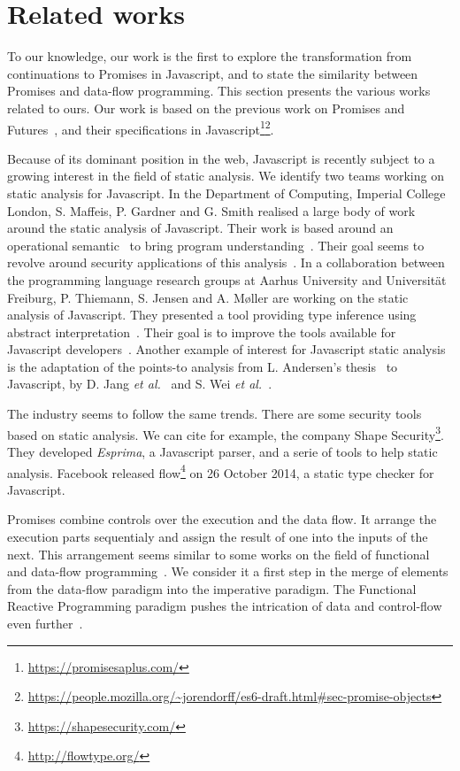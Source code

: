 \section{Related works} \label{section:related}

To our knowledge, our work is the first to explore the transformation from continuations to Promises in Javascript, and to state the similarity between Promises and data-flow programming.
This section presents the various works related to ours.
Our work is based on the previous work on Promises and Futures~\cite{Liskov1988}, and their specifications in Javascript\footnote{\url{https://promisesaplus.com/}}\footnote{\url{https://people.mozilla.org/~jorendorff/es6-draft.html\#sec-promise-objects}}.


Because of its dominant position in the web, Javascript is recently subject to a growing interest in the field of static analysis.
We identify two teams working on static analysis for Javascript.
In the Department of Computing, Imperial College London, S. Maffeis, P. Gardner and G. Smith realised a large body of work around the static analysis of Javascript.
Their work is based around an operational semantic~\cite{Maffeis2008} to bring program understanding~\cite{Smith2011,Gardner2012,Gardner2013,Bodin2014}.
Their goal seems to revolve around security applications of this analysis~\cite{Maffeis2009,Maffeis2009a}.
In a collaboration between the programming language research groups at Aarhus University and Universität Freiburg, P. Thiemann, S. Jensen and A. Møller are working on the static analysis of Javascript.
They presented a tool providing type inference using abstract interpretation~\cite{Thiemann2005,Jensen2009,Jensen2012}.
Their goal is to improve the tools available for Javascript developers~\cite{Andreasen}.
Another example of interest for Javascript static analysis is the adaptation of the points-to analysis from L. Andersen's thesis~\cite{Andersen1994} to Javascript, by D. Jang \textit{et al.}~\cite{Jang2009} and S. Wei \textit{et al.}~\cite{Wei2014}.

The industry seems to follow the same trends.
There are some security tools based on static analysis.
We can cite for example, the company Shape Security\footnote{\url{https://shapesecurity.com/}}.
They developed \textit{Esprima}, a Javascript parser, and a serie of tools to help static analysis.
Facebook released flow\footnote{\url{http://flowtype.org/}} on 26 October 2014, a static type checker for Javascript.

Promises combine controls over the execution and the data flow.
It arrange the execution parts sequentialy and assign the result of one into the inputs of the next.
This arrangement seems similar to some works on the field of functional and data-flow programming~\cite{Johnston2004,Cohen2012,Morrison1994,Kahn1974}.
We consider it a first step in the merge of elements from the data-flow paradigm into the imperative paradigm.
The Functional Reactive Programming paradigm pushes the intrication of data and control-flow even further~\cite{Winograd-Cort2013}.

